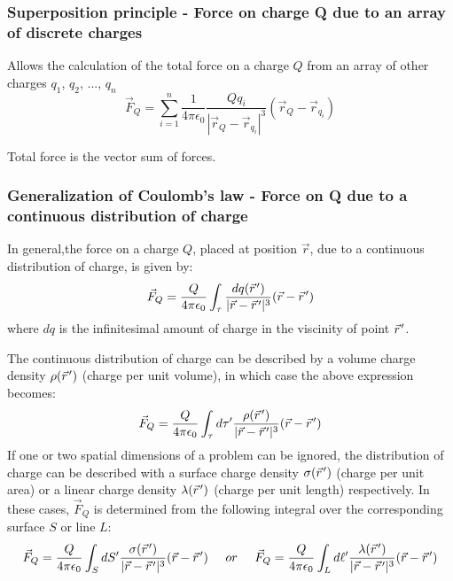 \documentclass[english,11pt]{article}
\newcommand{\pvec}[1]{\vec{#1}\mkern2mu\vphantom{#1}}
\begin{document}
\subsubsection*{\bf Superposition principle - Force on charge Q due to an array of discrete charges}
    \begin{itemize}
    {\small
       \item Allows the calculation of the total force on a charge $Q$
             from an array of other charges $q_1$, $q_2$, ..., $q_n$
        \begin{equation*}
         \vec{F}_{Q} = \sum_{i=1}^{n} \frac{1}{4\pi\epsilon_0}
            \frac{Q q_i}{|\vec{r}_{Q}-\vec{r}_{q_{i}}|^{3}} (\vec{r}_{Q}-\vec{r}_{q_{i}})
         \end{equation*}
       \item Total force is the vector sum of forces.
    }
    \end{itemize}

\subsubsection*{\bf Generalization of Coulomb's law - Force on Q due to a continuous distribution of charge}

In general,the force on a charge $Q$, placed at position $\vec{r}$,
due to a continuous distribution of charge, is given by:
      {\small
         \begin{equation*}
            \vec{F}_{Q} = \frac{Q}{4\pi\epsilon_0} \int_{\tau}
               \frac{dq({\pvec{r}'})}{|\vec{r}-\pvec{r}'|^{3}} (\vec{r}-\pvec{r}')
         \end{equation*}
      }
where $dq$ is the infinitesimal amount of charge in the viscinity of point $\pvec{r}'$.

The continuous distribution of charge can be described by a volume charge density $\rho(\pvec{r}')$
(charge per unit volume), in which case the above expression becomes:
      {\small
         \begin{equation*}
            \vec{F}_{Q} = \frac{Q}{4\pi\epsilon_0} \int_{\tau}
               d\tau^{\prime} \frac{\rho({\pvec{r}'})}{|\vec{r}-\pvec{r}'|^{3}} (\vec{r}-\pvec{r}')
         \end{equation*}
      }
If one or two spatial dimensions of a problem can be ignored, the distribution of charge
can be described with a surface charge density $\sigma(\pvec{r}')$ (charge per unit area)
or a linear charge density $\lambda(\pvec{r}')$ (charge per unit length) respectively.
In these cases, $\vec{F}_{Q}$ is determined from the following integral over the
corresponding surface $S$ or line $L$:
{\small
   \begin{equation*}
      \vec{F}_{Q} = \frac{Q}{4\pi\epsilon_0} \int_{S}
         dS^{\prime} \frac{\sigma({\pvec{r}'})}{|\vec{r}-\pvec{r}'|^{3}} (\vec{r}-\pvec{r}')
      \;\;\;\;\; or \;\;\;\;\;
      \vec{F}_{Q} = \frac{Q}{4\pi\epsilon_0} \int_{L}
        d\ell^{\prime} \frac{\lambda({\pvec{r}'})}{|\vec{r}-\pvec{r}'|^{3}} (\vec{r}-\pvec{r}')
   \end{equation*}
}
\end{document}
